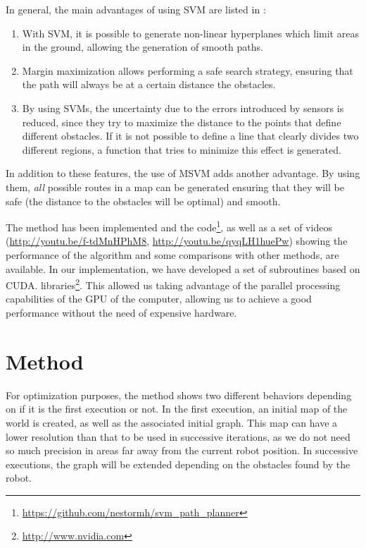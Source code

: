 In general, the main advantages of using \ac{SVM}  are listed in \cite{miura2006support}:

\begin{enumerate}
\item With \ac{SVM}, it is possible to generate non-linear hyperplanes which limit areas in the ground, allowing the generation of smooth paths.
\item Margin maximization allows performing a safe search strategy, ensuring that the path will always be at a certain distance the obstacles.
\item By using \acp{SVM}, the uncertainty due to the errors introduced by sensors is reduced, since they try to maximize the distance to the points that define different obstacles. If it is not possible to define a line that clearly divides two different regions, a function that tries to minimize this effect is generated.
\end{enumerate}

In addition to these features, the use of \acl{MSVM} adds another advantage.  By using them, \emph{all} possible routes in a map can be generated ensuring that they will be safe (the distance to the obstacles will be optimal) and smooth.

The method has been implemented and the code\footnote{\url{https://github.com/nestormh/svm_path_planner}}, as well as a set of videos (\url{http://youtu.be/f-tdMnHPhM8}, \url{http://youtu.be/qyqLH1huePw}) showing the performance of the algorithm and some comparisons with other methods, are available. In our implementation, we have developed a set of subroutines based on \ac{CUDA}. libraries\footnote{\url{http://www.nvidia.com}}. This allowed us taking advantage of the parallel processing capabilities of the \ac{GPU} of the computer, allowing us to achieve a good performance without the need of expensive hardware.

\section{Method}\label{ch:chapter06_01}

For optimization purposes, the method shows two different behaviors depending on if it is the first execution or not. In the first execution, an initial map of the world is created, as well as the associated initial graph. This map can have a lower resolution than that to be used in successive iterations, as we do not need so much precision in areas far away from the current robot position. In successive executions, the graph will be extended depending on the obstacles found by the robot.

